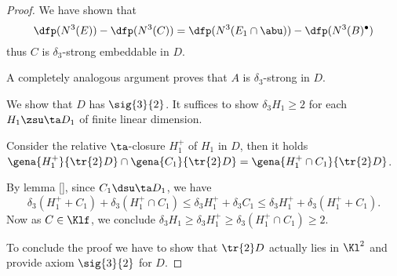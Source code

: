 \begin{proof}
We have shown that
$$\dfp(N^{3}(E))-\dfp(N^{3}(C))=\dfp(N^{3}(E_{1}\cap\abu))-\dfp(N^{3}(B)^{\bullet})$$
thus $C$ is $\delta_{3}$-strong embeddable in $D$.

A completely analogous argument proves that $A$ is $\delta_{3}$-strong in $D$.

\smallskip
We show that $D$ has $\sig{3}{2}$.
It suffices to show $\delta_{3}H_{1}\geq2$ for each  $H_{1}\zsu\ta D_{1}$ of finite linear dimension. 

Consider the relative $\ta$-closure $H_{1}^{+}$ of $H_{1}$ in $D$, then it holds
$\gena{H_{1}^{+}}{\tr{2}D}\cap\gena{C_{1}}{\tr{2}D}=\gena{H_{1}^{+}\cap C_{1}}{\tr{2}D}$.

By lemma \ref{}, since $C_{1}\dsu\ta D_{1}$, we have
$$
\delta_{3}(H_{1}^{+}+C_{1})+\delta_{3}(H_{1}^{+}\cap C_{1})
\leq\delta_{3}H_{1}^{+}+\delta_{3}C_{1}\leq\delta_{3}H_{1}^{+}+\delta_{3}(H_{1}^{+}+C_{1}).
$$
Now as $C\in\Klf$, we conclude
$\delta_{3}H_{1}\geq\delta_{3}H_{1}^{+}\geq\delta_{3}(H_{1}^{+}\cap C_{1})\geq2$.


To conclude the proof we have to
show that $\tr{2}D$ actually lies in $\Kl^{2}$ and provide axiom $\sig{3}{2}$ for $D$.
\end{proof}
